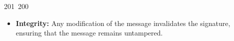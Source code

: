 201~200~\documentclass{article}
\begin{document}
\begin{itemize}
	                                                                                                                                                                                                                                                                                                	                                                                                                                                        	    	                                                                                                	                                                                                                                                                                                                                                                                                                                                	                                                                        	                                                                        	                                                                                                                                        	                                                                                                                                                                                                                        	                                                                                                                            	                                                                	                                                                                    \item \textbf{Integrity:} Any modification of the message invalidates the signature, ensuring that the message remains untampered.

\end{itemize}
\end{document}
